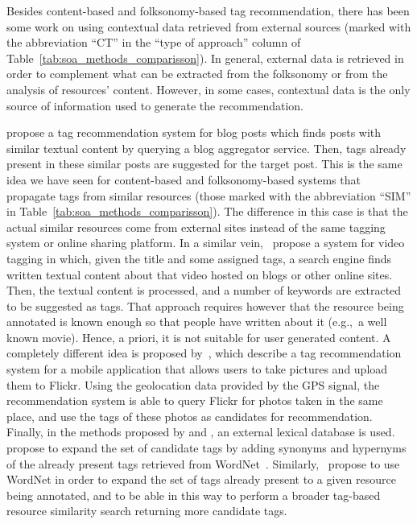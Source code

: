 Besides content-based and folksonomy-based tag recommendation, there has been some work on using contextual data retrieved from external sources (marked with the abbreviation ``CT'' in the ``type of approach'' column of Table~\ref{tab:soa_methods_comparisson}).
In general, external data is retrieved in order to complement what can be extracted from the folksonomy or from the analysis of resources' content.
However, in some cases, contextual data is the only source of information used to generate the recommendation.

\cite{Sood2007} propose a tag recommendation system for blog posts which finds posts with similar textual content by querying a blog aggregator service. Then, tags already present in these similar posts are suggested for the target post. This is the same idea we have seen for content-based and folksonomy-based systems that propagate tags from similar resources (those marked with the abbreviation ``SIM'' in Table~\ref{tab:soa_methods_comparisson}). The difference in this case is that the actual similar resources come from external sites instead of the same tagging system or online sharing platform.
In a similar vein,~\cite{Chen2010} propose a system for video tagging in which, given the title and some assigned tags, a search engine finds written textual content about that video hosted on blogs or other online sites. Then, the textual content is processed, and a number of keywords are extracted to be suggested as tags. That approach requires however that the resource being annotated is known enough so that people have written about it (e.g.,~a well known movie). Hence, a priori, it is not suitable for user generated content.
A completely different idea is proposed by~\cite{Naaman2008}, which describe a tag recommendation system for a mobile application that allows users to take pictures and upload them to Flickr. Using the geolocation data provided by the GPS signal, the recommendation system is able to query Flickr for photos taken in the same place, and use the tags of these photos as candidates for recommendation.
Finally, in the methods proposed by \cite{Liu2010a} and \cite{Ballan2010}, an external lexical database is used. 
\cite{Liu2010a} propose to expand the set of candidate tags by adding synonyms and hypernyms of the already present tags retrieved from WordNet~\citep{Miller1995}.
Similarly,~\cite{Ballan2010} propose to use WordNet in order to expand the set of tags already present to a given resource being annotated, and to be able in this way to perform a broader tag-based resource similarity search returning more candidate tags.




